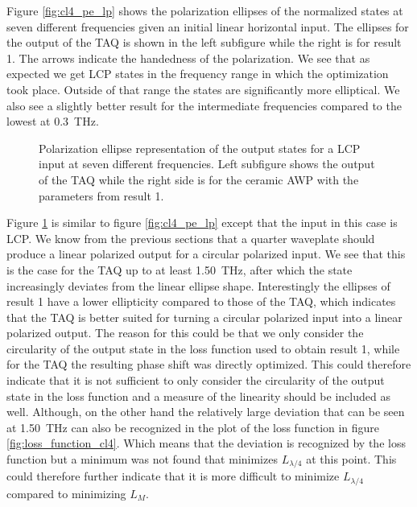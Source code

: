 Figure \ref{fig:cl4_pe_lp} shows the polarization ellipses of the normalized states at seven different frequencies given an initial linear horizontal input. The ellipses for the output of the TAQ is shown in the left subfigure while the right is for result 1. The arrows indicate the handedness of the polarization. We see that as expected we get LCP states in the frequency range in which the optimization took place. Outside of that range the states are significantly more elliptical. We also see a slightly better result for the intermediate frequencies compared to the lowest at \SI{0.3}{\tera \hertz}. 


\begin{figure}[H]
    \centering
    
    \caption{Polarization ellipse representation of the output states for a LCP input at seven different frequencies. Left subfigure shows the output of the TAQ while the right side is for the ceramic AWP with the parameters from result 1.}
    \label{fig:cl4_pe_cp}
\end{figure}

Figure \ref{fig:cl4_pe_cp} is similar to figure \ref{fig:cl4_pe_lp} except that the input in this case is LCP. We know from the previous sections that a quarter waveplate should produce a linear polarized output for a circular polarized input. We see that this is the case for the TAQ up to at least \SI{1.50}{\tera \hertz}, after which the state increasingly deviates from the linear ellipse shape. Interestingly the ellipses of result 1 have a lower ellipticity compared to those of the TAQ, which indicates that the TAQ is better suited for turning a circular polarized input into a linear polarized output. The reason for this could be that we only consider the circularity of the output state in the loss function used to obtain result 1, while for the TAQ the resulting phase shift was directly optimized. This could therefore indicate that it is not sufficient to only consider the circularity of the output state in the loss function and a measure of the linearity should be included as well. Although, on the other hand the relatively large deviation that can be seen at \SI{1.50}{\tera \hertz} can also be recognized in the plot of the loss function in figure \ref{fig:loss_function_cl4}. Which means that the deviation is recognized by the loss function but a minimum was not found that minimizes $L_{\lambda/4}$ at this point. This could therefore further indicate that it is more difficult to minimize $L_{\lambda/4}$ compared to minimizing $L_M$.

